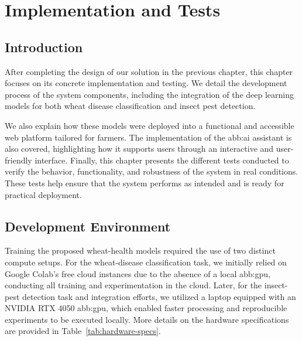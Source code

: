 \chapter{Implementation and Tests}

\section{Introduction}

After completing the design of our solution in the previous chapter, this chapter focuses on its concrete implementation and testing. We detail the development process of the system components, including the integration of the deep learning models for both wheat disease classification and insect pest detection.

We also explain how these models were deployed into a functional and accessible web platform tailored for farmers. The implementation of the \gls{abb:ai} assistant is also covered, highlighting how it supports users through an interactive and user-friendly interface. Finally, this chapter presents the different tests conducted to verify the behavior, functionality, and robustness of the system in real conditions. These tests help ensure that the system performs as intended and is ready for practical deployment.



\section{Development Environment}
Training the proposed wheat-health models required the use of two distinct compute setups. For the wheat-disease classification task, we initially relied on Google Colab’s free cloud instances due to the absence of a local \gls{abb:gpu}, conducting all training and experimentation in the cloud. Later, for the insect-pest detection task and integration efforts, we utilized a laptop equipped with an NVIDIA RTX 4050 \gls{abb:gpu}, which enabled faster processing and reproducible experiments to be executed locally. More details on the hardware specifications are provided in Table~\ref{tab:hardware-specs}.

\begin{table}[H]
    \caption{Hardware specifications by task}
    \centering
    \label{tab:hardware-specs}
\end{table}

